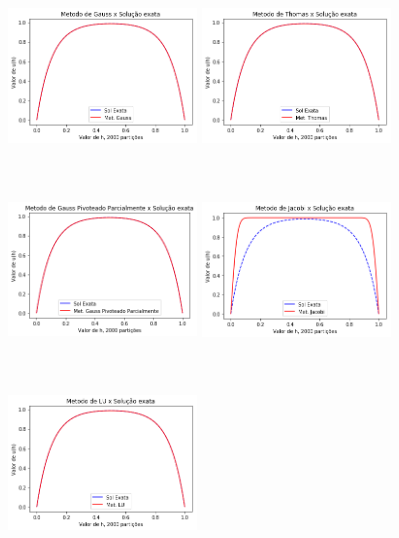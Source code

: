 \documentclass{article}
\begin{document}
\begin{itemize}
\begin{figure}[!htb]
\includegraphics[width=5cm,height=5cm]{G2000part.png}
\includegraphics [width=5cm,height=5cm]{T2000part}
\includegraphics [width=5cm,height=5cm]{GP2000part.png}
\includegraphics [width=5cm,height=5cm]{J2000part.png}
\includegraphics [width=5cm,height=5cm]{LU2000part.png}

\end{figure}
\end{itemize}
\end{document}

